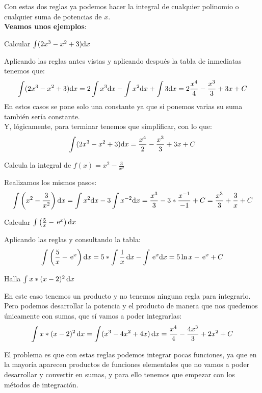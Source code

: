 \documentclass[a4paper,11pt,answers]{exam}
\begin{document}
Con estas dos reglas ya podemos hacer la integral de cualquier polinomio o cualquier suma de potencias de $x$.\\
\textbf{Veamos unos ejemplos}:
\begin{questions}
\question Calcular $\int (2x^3 - x^2 + 3) \mathrm{d}x$
\begin{solution}
Aplicando las reglas antes vistas y aplicando después la tabla de inmediatas tenemos que:
\[\int (2x^3 - x^2 + 3) \mathrm{d}x = 2\int x^3 \mathrm{d}x- \int x^2 \mathrm{d}x + \int 3 \mathrm{d}x = 2\frac{x^4}{4} - \frac{x^3}{3} + 3x + C\]
En estos casos se pone solo una constante ya que si ponemos varias su suma también sería constante.\\
Y, lógicamente, para terminar tenemos que simplificar, con lo que:
\[\int (2x^3 - x^2 + 3) \mathrm{d}x = \frac{x^4}{2} - \frac{x^3}{3} + 3x + C\]
\end{solution}

\question Calcula la integral de $f(x) = x^2 - \frac{3}{x^2}$
\begin{solution}
Realizamos los mismos pasos:
\[\int \left(x^2 - \frac{3}{x^2} \right) \mathrm{d}x = \int x^2 \mathrm{d}x - 3 \int x^{-2} \mathrm{d}x = \frac{x^3}{3} -3* \frac{x^{-1}}{-1} + C =
\frac{x^3}{3} + \frac{3}{x} + C\]
\end{solution}

\question Calcular $\int \left(\frac{5}{x} - \,\mathrm{e}^x\right) \mathrm{d}x$
\begin{solution}
Aplicando las reglas y consultando la tabla:
\[\int \left(\frac{5}{x} - \,\mathrm{e}^x\right) \mathrm{d}x = 5*\int \frac{1}{x}\,\mathrm{d}x - \int \,\mathrm{e}^x \mathrm{d}x = 5\ln x - \,\mathrm{e}^x + C\]
\end{solution}

\question Halla $\int x*(x - 2)^2 \, \mathrm{d}x$
\begin{solution}
En este caso tenemos un producto y no tenemos ninguna regla para integrarlo. Pero podemos desarrollar la potencia y el producto de manera que nos quedemos únicamente con sumas, que sí vamos a poder integrarlas:
\[\int x*(x-2)^2\, \mathrm{d}x = \int (x^3 - 4x^2 + 4x)\,\mathrm{d}x = \frac{x^4}{4} - \frac{4x^3}{3} + 2x^2 + C\]
\end{solution}
\end{questions}

El problema es que con estas reglas podemos integrar pocas funciones, ya que en la mayoría aparecen productos de funciones elementales que no vamos a poder desarrollar y convertir en sumas, y para ello tenemos que empezar con los métodos de integración.
\end{document}
